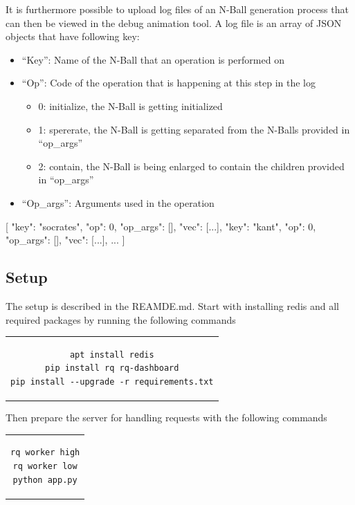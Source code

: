 \documentclass[]{article}
\begin{document}
It is furthermore possible to upload log files of an N-Ball generation process that can then be viewed in the debug animation tool. A log file is an array of JSON objects that have following key:
\begin{itemize}
\item “Key”: Name of the N-Ball that an operation is performed on
\item “Op”: Code of the operation that is happening at this step in the log
\begin{itemize}
\item 0: initialize, the N-Ball is getting initialized 
\item 1: spererate, the N-Ball is getting separated from the N-Balls provided in “op\_args”
\item 2: contain, the N-Ball is being enlarged to contain the children provided in “op\_args”
\end{itemize}
\item “Op\_args”: Arguments used in the operation
\end{itemize}
[ {"key": "socrates", "op": 0, "op\_args": [], "vec": [...]}, 
{"key": "kant", "op": 0, "op\_args": [], "vec": [...]}, ... ]	


\subsection{Setup}
The setup is described in the REAMDE.md.
Start with installing redis and all required packages by running the following commands

\begin{center}
\begin{tabular}{c}
\begin{lstlisting}
apt install redis
pip install rq rq-dashboard
pip install --upgrade -r requirements.txt
\end{lstlisting}
\end{tabular}
\end{center}

Then prepare the server for handling requests with the following commands

\begin{center}
\begin{tabular}{c}
\begin{lstlisting}
rq worker high
rq worker low
python app.py
\end{lstlisting}
\end{tabular}
\end{center}
\end{document}
